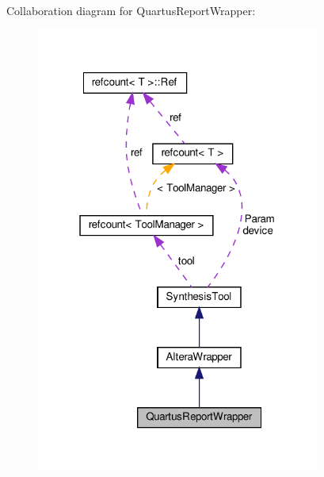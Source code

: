 Collaboration diagram for Quartus\+Report\+Wrapper\+:
\nopagebreak
\begin{figure}[H]
\begin{center}
\leavevmode
\includegraphics[width=265pt]{df/d18/classQuartusReportWrapper__coll__graph}
\end{center}
\end{figure}
